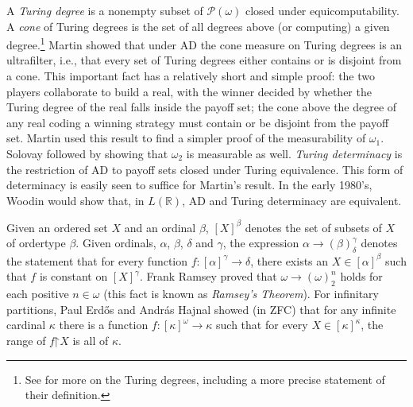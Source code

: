 \documentclass{book}%
\newcommand{\restrict}{\mathord{\upharpoonright}}
\begin{document}
A \emph{Turing degree} is a nonempty subset of $\mathcal{P}(\omega)$ closed under
equicomputability. A \emph{cone} of Turing degrees is the set of all degrees above
(or computing) a given degree.\footnote{See \cite{Soare:1987, Cooper:2004}
for more on the Turing degrees, including a more precise statement of their definition.}
Martin  showed that under AD the cone measure on
Turing degrees is an ultrafilter, i.e., that every set of Turing degrees either
contains or is disjoint from a cone. This important fact has a
relatively short and simple proof: the two players collaborate to
build a real, with the winner decided by whether the Turing degree
of the real falls inside the payoff set; the cone above the degree
of any real coding a winning strategy must contain or be disjoint
from the payoff set. Martin used this result to find a simpler
proof of the measurability of $\omega_{1}$. Solovay followed by showing that
$\omega_{2}$ is measurable as well.
\emph{Turing
determinacy} is the restriction of AD to
payoff sets closed under Turing equivalence. This form of
determinacy is easily seen to suffice for Martin's result.
In the early 1980's, Woodin would show that,
in $L(\mathbb{R})$, AD and Turing determinacy are equivalent.



Given an ordered set $X$ and an ordinal $\beta$, $[X]^{\beta}$
denotes the set of subsets of $X$ of ordertype $\beta$. Given
ordinals, $\alpha$, $\beta$, $\delta$ and $\gamma$, the expression
$\alpha \to (\beta)^{\gamma}_{\delta}$ denotes the statement that
for every function $f \colon [\alpha]^{\gamma} \to \delta$, there
exists an $X \in [\alpha]^{\beta}$ such that $f$ is constant on
$[X]^{\gamma}$. Frank Ramsey  proved that $\omega \to (\omega)^{n}_{2}$
holds for each positive $n \in \omega$ (this fact is known as
\emph{Ramsey's Theorem}).  For infinitary partitions, Paul Erd\H{o}s and
Andr\'{a}s Hajnal  showed (in ZFC) that for any infinite
cardinal $\kappa$ there is a function $f \colon [\kappa]^{\omega} \to
\kappa$ such that for every $X \in [\kappa]^{\kappa}$, the range of
$f \restrict X$ is all of $\kappa$.
\end{document}
